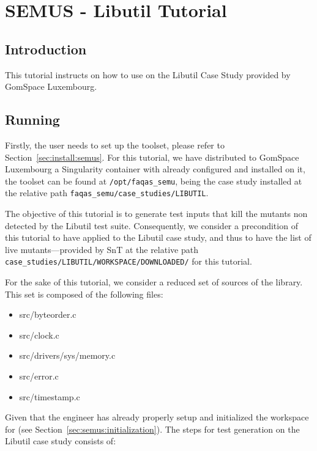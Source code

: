 
\chapter{SEMUS - Libutil Tutorial}
\label{chapter:semus:tutorial}

\section{Introduction}

This tutorial instructs on how to use \SEMUS on the Libutil Case Study provided by GomSpace Luxembourg.

\section{Running \SEMUS}
\label{sec:semus_running}

Firstly, the user needs to set up the \SEMUS toolset, please refer to Section~\ref{sec:install:semus}. For this tutorial, we have distributed to GomSpace Luxembourg a Singularity container with \SEMUS already configured and installed on it, the toolset can be found at \texttt{/opt/faqas\_semu}, being the case study installed at the relative path \texttt{faqas\_semu/case\_studies/LIBUTIL}.

The objective of this tutorial is to generate test inputs that kill the mutants non detected by the Libutil test suite. Consequently, we consider a precondition of this tutorial to have applied \MASS to the Libutil case study, and thus to have the list of live mutants---provided by SnT at the relative path \texttt{case\_studies/LIBUTIL/WORKSPACE/DOWNLOADED/} for this tutorial.

For the sake of this tutorial, we consider a reduced set of sources of the library. This set is composed of the following files:

\begin{itemize}
    \item src/byteorder.c
    \item src/clock.c
    \item src/drivers/sys/memory.c
    \item src/error.c
    \item src/timestamp.c
\end{itemize}

Given that the engineer has already properly setup and initialized the workspace for \SEMUS (see Section~\ref{sec:semus:initialization}). The steps for test generation on the Libutil case study consists of:

